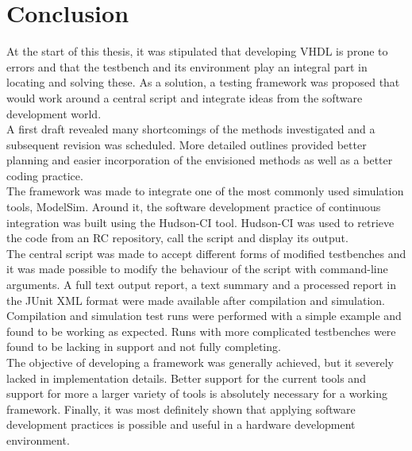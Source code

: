 \documentclass[11pt,british]{article}
\begin{document}
\section{Conclusion}
At the start of this thesis, it was stipulated that developing \gls{VHDL} is prone to errors and that the testbench and its environment play an integral part in locating and solving these. As a solution, a testing framework was proposed that would work around a central script and integrate ideas from the software development world.
\\[\baselineskip]
A first draft revealed many shortcomings of the methods investigated and a subsequent revision was scheduled. More detailed outlines provided better planning and easier incorporation of the envisioned methods as well as a better coding practice.
\\[\baselineskip]
The framework was made to integrate one of the most commonly used simulation tools, ModelSim. Around it, the software development practice of continuous integration was built using the Hudson-CI tool. Hudson-CI was used to retrieve the code from an RC repository, call the script and display its output.
\\[\baselineskip]
The central script was made to accept different forms of modified testbenches and it was made possible to modify the behaviour of the script with command-line arguments. A full text output report, a text summary and a processed report in the JUnit XML format were made available after compilation and simulation.
\\[\baselineskip]
Compilation and simulation test runs were performed with a simple example and found to be working as expected. Runs with more complicated testbenches were found to be lacking in support and not fully completing.
\\[\baselineskip]
The objective of developing a framework was generally achieved, but it severely lacked in implementation details. Better support for the current tools and support for more a larger variety of tools is absolutely necessary for a working framework. Finally, it was most definitely shown that applying software development practices is possible and useful in a hardware development environment.

\pagebreak{}

\printbibliography[heading=bibintoc]

\newpage{}
\end{document}
